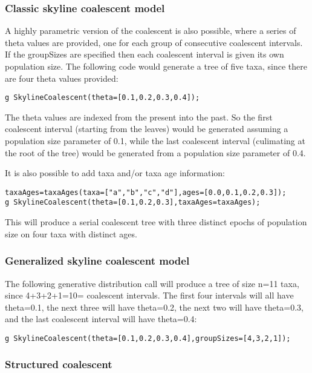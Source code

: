 \documentclass[10pt,letterpaper,table]{article}
\begin{document}
\subsubsection*{Classic skyline coalescent model}

A highly parametric version of the coalescent is also possible, where
a series of theta values are provided, one for each group of consecutive coalescent intervals.
If the groupSizes are specified then each coalescent interval is given its
own population size.
The following code would generate a tree of five taxa, since there are four theta values provided:

\begin{alltt}
  g ~ SkylineCoalescent(theta=[0.1, 0.2, 0.3, 0.4]);
\end{alltt}

The theta values are indexed from the present into the past.
So the first coalescent interval (starting from the leaves)
would be generated assuming a population size parameter of 0.1, while
the last coalescent interval (culimating at the root of the tree)
would be generated from a population size parameter of 0.4.

It is also possible to add taxa and/or taxa age information:

\begin{alltt}
  taxaAges = taxaAges(taxa=["a", "b", "c", "d"], ages=[0.0, 0.1, 0.2, 0.3]);
  g ~ SkylineCoalescent(theta=[0.1, 0.2, 0.3], taxaAges=taxaAges);
\end{alltt}

This will produce a serial coalescent tree with three distinct epochs
of population size on four taxa with distinct ages.

\subsubsection*{Generalized skyline coalescent model}

The following generative distribution call will produce a tree of size
n=11 taxa, since 4+3+2+1=10= coalescent intervals.
The first four intervals will all have theta=0.1, the next three will
have theta=0.2, the next two will have theta=0.3, and the last
coalescent interval will have theta=0.4:

\begin{alltt}
  g ~ SkylineCoalescent(theta=[0.1, 0.2, 0.3, 0.4], groupSizes=[4,3,2,1]);
\end{alltt}

\subsubsection*{Structured coalescent}
\end{document}
